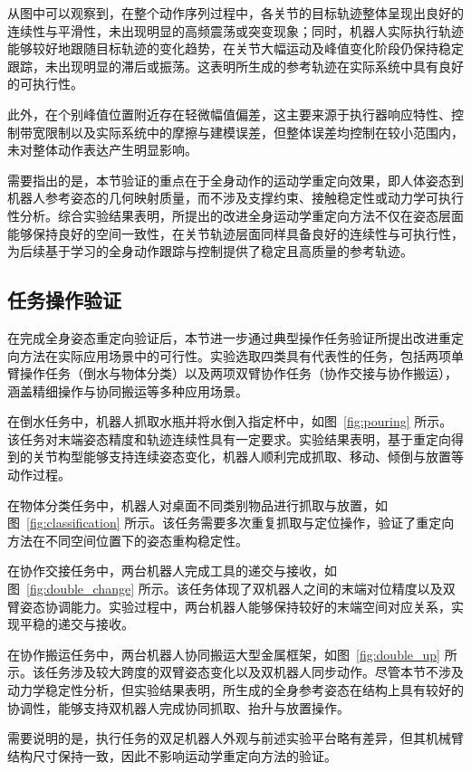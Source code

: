 从图中可以观察到，在整个动作序列过程中，各关节的目标轨迹整体呈现出良好的连续性与平滑性，未出现明显的高频震荡或突变现象；同时，机器人实际执行轨迹能够较好地跟随目标轨迹的变化趋势，在关节大幅运动及峰值变化阶段仍保持稳定跟踪，未出现明显的滞后或振荡。这表明所生成的参考轨迹在实际系统中具有良好的可执行性。

此外，在个别峰值位置附近存在轻微幅值偏差，这主要来源于执行器响应特性、控制带宽限制以及实际系统中的摩擦与建模误差，但整体误差均控制在较小范围内，未对整体动作表达产生明显影响。

需要指出的是，本节验证的重点在于全身动作的运动学重定向效果，即人体姿态到机器人参考姿态的几何映射质量，而不涉及支撑约束、接触稳定性或动力学可执行性分析。综合实验结果表明，所提出的改进全身运动学重定向方法不仅在姿态层面能够保持良好的空间一致性，在关节轨迹层面同样具备良好的连续性与可执行性，为后续基于学习的全身动作跟踪与控制提供了稳定且高质量的参考轨迹。


\subsection{任务操作验证}
\label{subsec:task_validation}

在完成全身姿态重定向验证后，本节进一步通过典型操作任务验证所提出改进重定向方法在实际应用场景中的可行性。实验选取四类具有代表性的任务，包括两项单臂操作任务（倒水与物体分类）以及两项双臂协作任务（协作交接与协作搬运），涵盖精细操作与协同搬运等多种应用场景。

在倒水任务中，机器人抓取水瓶并将水倒入指定杯中，如图~\ref{fig:pouring} 所示。该任务对末端姿态精度和轨迹连续性具有一定要求。实验结果表明，基于重定向得到的关节构型能够支持连续姿态变化，机器人顺利完成抓取、移动、倾倒与放置等动作过程。

在物体分类任务中，机器人对桌面不同类别物品进行抓取与放置，如图~\ref{fig:classification} 所示。该任务需要多次重复抓取与定位操作，验证了重定向方法在不同空间位置下的姿态重构稳定性。

在协作交接任务中，两台机器人完成工具的递交与接收，如图~\ref{fig:double_change} 所示。该任务体现了双机器人之间的末端对位精度以及双臂姿态协调能力。实验过程中，两台机器人能够保持较好的末端空间对应关系，实现平稳的递交与接收。

在协作搬运任务中，两台机器人协同搬运大型金属框架，如图~\ref{fig:double_up} 所示。该任务涉及较大跨度的双臂姿态变化以及双机器人同步动作。尽管本节不涉及动力学稳定性分析，但实验结果表明，所生成的全身参考姿态在结构上具有较好的协调性，能够支持双机器人完成协同抓取、抬升与放置操作。

需要说明的是，执行任务的双足机器人外观与前述实验平台略有差异，但其机械臂结构尺寸保持一致，因此不影响运动学重定向方法的验证。

